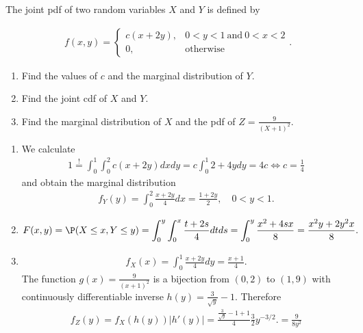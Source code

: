 
\begin{exercise}

The joint pdf of two random variables $X$ and $Y$ is defined by

\begin{align*}
    f(x, y)
    =
    \begin{cases}
        c (x + 2 y), & 0 < y < 1 ~\text{and}~ 0 < x < 2 \\
        0,           & \text{otherwise}
    \end{cases}.
\end{align*}

\begin{enumerate}[label = (\alph*)]
    \item Find the values of $c$ and the marginal distribution of $Y$.
    \item Find the joint cdf of $X$ and $Y$.
    \item Find the marginal distribution of $X$ and the pdf of $Z = \frac{9}{(X + 1)^2}$.
\end{enumerate}

\end{exercise}


\begin{solution}

\phantom{}

\begin{enumerate}[label = (\alph*)]
  \item We calculate
  \begin{align*}
    1 \stackrel{!}{=} \int_0^1\int_0^2 c(x + 2y) dx dy = c\int_0^1 2 + 4y dy = 4c
    \iff c = \frac{1}{4}
  \end{align*}
  and obtain the marginal distribution
  \begin{align*}
    f_Y(y) = \int_0^2 \frac{x + 2y}{4} dx = \frac{1 + 2y}{2}, \quad 0 < y < 1.
  \end{align*}
  \item
  \begin{align*}
    F(x,y) = \P(X \leq x, Y \leq y) = \int_0^y\int_0^x \frac{t+2s}{4} dt ds
    = \int_0^y \frac{x^2 + 4sx}{8} = \frac{x^2y + 2y^2x}{8}.
  \end{align*}
  \item
  \begin{align*}
    f_X(x) = \int_0^1 \frac{x + 2y}{4} dy = \frac{x + 1}{4}.
  \end{align*}
  The function $g(x) = \frac{9}{(x+1)^2}$ is a bijection from $(0,2)$ to $(1,9)$
  with continuously differentiable inverse $h(y) = \frac{3}{\sqrt{y}} - 1$.
  Therefore
  \begin{align*}
    f_Z(y) = f_X(h(y))|h'(y)| = \frac{\frac{3}{\sqrt{y}} - 1 + 1}{4}\frac{3}{2}y^{-3/2}.
    = \frac{9}{8y^2}
  \end{align*}
\end{enumerate}

\end{solution}

